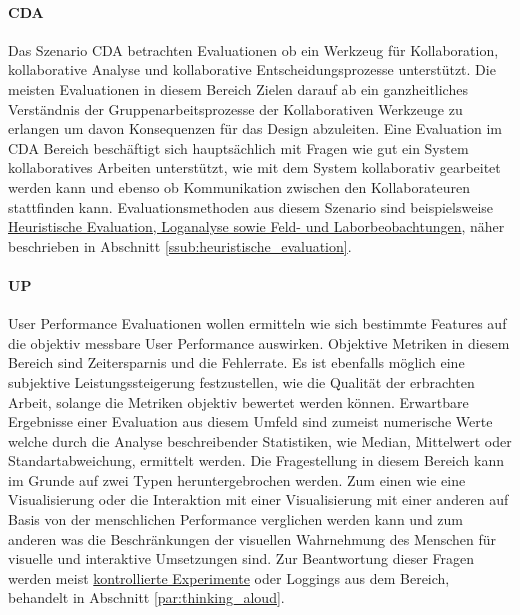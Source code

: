 \documentclass[draft=false
              ,paper=a4
              ,twoside=false
              ,fontsize=11pt
              ,headsepline
              ,BCOR10mm
              ,DIV11
              ]{scrbook}
\begin{document}
\paragraph{CDA} %
\label{par:cda}
Das Szenario CDA betrachten Evaluationen ob ein Werkzeug für Kollaboration, kollaborative Analyse und kollaborative Entscheidungsprozesse unterstützt. Die meisten Evaluationen in diesem Bereich Zielen darauf ab ein ganzheitliches Verständnis der Gruppenarbeitsprozesse der Kollaborativen Werkzeuge zu erlangen um davon Konsequenzen für das Design abzuleiten. Eine Evaluation im CDA Bereich beschäftigt sich hauptsächlich mit Fragen wie gut ein System kollaboratives Arbeiten unterstützt, wie mit dem System kollaborativ gearbeitet werden kann und ebenso ob Kommunikation zwischen den Kollaborateuren stattfinden kann. Evaluationsmethoden aus diesem Szenario sind beispielsweise \hyperref[par:cooperative_evaluation]{Heuristische Evaluation, Loganalyse sowie Feld- und Laborbeobachtungen}, näher beschrieben in Abschnitt \ref{ssub:heuristische_evaluation}.

 \paragraph{UP} %
 \label{par:up}
 User Performance Evaluationen wollen ermitteln wie sich bestimmte Features auf die objektiv messbare User Performance auswirken. Objektive Metriken in diesem Bereich sind Zeitersparnis und die Fehlerrate. Es ist ebenfalls möglich eine subjektive Leistungssteigerung festzustellen, wie die Qualität der erbrachten Arbeit, solange die Metriken objektiv bewertet werden können. Erwartbare Ergebnisse einer Evaluation aus diesem Umfeld sind zumeist numerische Werte welche durch die Analyse beschreibender Statistiken, wie Median, Mittelwert oder Standartabweichung, ermittelt werden. Die Fragestellung in diesem Bereich kann im Grunde auf zwei Typen heruntergebrochen werden. Zum einen wie eine Visualisierung oder die Interaktion mit einer Visualisierung mit einer anderen auf Basis von der menschlichen Performance verglichen werden kann und zum anderen was die Beschränkungen der visuellen Wahrnehmung des Menschen für visuelle und interaktive Umsetzungen sind. Zur Beantwortung dieser Fragen werden meist \hyperref[ssub:empirische_techniken_auf_grundlage_von_experimenten]{kontrollierte Experimente} oder Loggings aus dem  Bereich, behandelt in Abschnitt \ref{par:thinking_aloud}.
\end{document}
